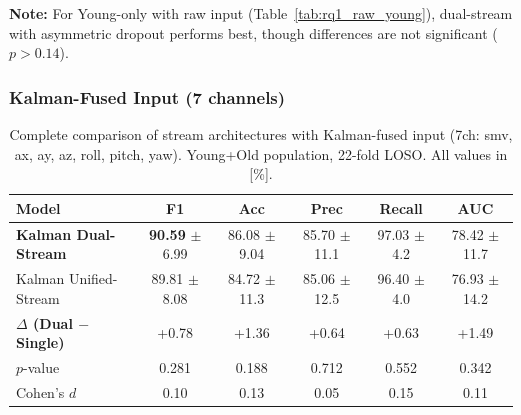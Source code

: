 \documentclass{article}
\begin{document}
\begin{table}[htbp]
    \centering
    \caption{Single vs Dual-Stream comparison: Raw acc+gyro input, Young-only population (22-fold LOSO). All values in [\%].}
    \label{tab:rq1_raw_young}
    \small
\end{table}

\textbf{Note:} For Young-only with raw input (Table~\ref{tab:rq1_raw_young}), dual-stream with asymmetric dropout performs best, though differences are not significant ($p > 0.14$).

\subsubsection{Kalman-Fused Input (7 channels)}

\begin{table}[htbp]
    \centering
    \caption{Complete comparison of stream architectures with Kalman-fused input (7ch: smv, ax, ay, az, roll, pitch, yaw). Young+Old population, 22-fold LOSO. All values in [\%].}
    \label{tab:rq1_kalman_yo}
    \small
    \begin{tabular}{lccccc}
        \toprule
        \textbf{Model} & \textbf{F1} & \textbf{Acc} & \textbf{Prec} & \textbf{Recall} & \textbf{AUC} \\
        \midrule
        \textbf{Kalman Dual-Stream} & \textbf{90.59} $\pm$ 6.99 & 86.08 $\pm$ 9.04 & 85.70 $\pm$ 11.1 & 97.03 $\pm$ 4.2 & 78.42 $\pm$ 11.7 \\
        Kalman Unified-Stream & 89.81 $\pm$ 8.08 & 84.72 $\pm$ 11.3 & 85.06 $\pm$ 12.5 & 96.40 $\pm$ 4.0 & 76.93 $\pm$ 14.2 \\
        \midrule
        \textbf{$\Delta$ (Dual $-$ Single)} & +0.78 & +1.36 & +0.64 & +0.63 & +1.49 \\
        $p$-value & 0.281 & 0.188 & 0.712 & 0.552 & 0.342 \\
        Cohen's $d$ & 0.10 & 0.13 & 0.05 & 0.15 & 0.11 \\
        \bottomrule
    \end{tabular}
\end{table}
\end{document}
